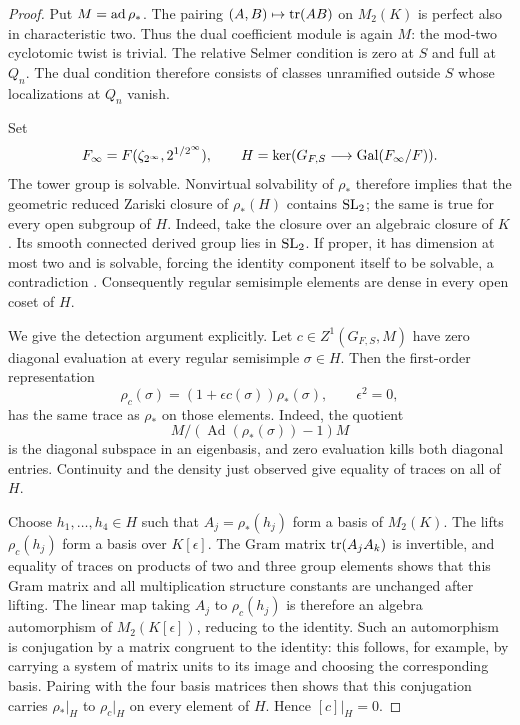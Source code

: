 \begin{proof}
Put $M=\operatorname{ad}\rho_*$.  The pairing $(A,B)\mapsto\operatorname{tr}(AB)$ on $M_2(K)$
is perfect also in characteristic two.  Thus the dual coefficient
module is again $M$: the mod-two cyclotomic twist is trivial.  The
relative Selmer condition is zero at $S$ and full at $Q_n$.  The dual
condition therefore consists of classes unramified outside $S$ whose
localizations at $Q_n$ vanish.

Set
\[
 F_\infty=F(\zeta_{2^\infty},2^{1/2^\infty}),\qquad
 H=\ker(G_{F,S}\longrightarrow\operatorname{Gal}(F_\infty/F)).
\]
The tower group is solvable.  Nonvirtual solvability of $\rho_*$
therefore implies that the geometric reduced Zariski closure of
$\rho_*(H)$ contains $\operatorname{SL}_2$; the same is true for every open subgroup
of $H$. Indeed, take the closure over an algebraic closure of \(K\).
Its smooth connected derived group lies in \(\operatorname{SL}_2\). If proper,
it has dimension at most two and is solvable, forcing the identity
component itself to be solvable, a contradiction
\cite[Corollaries~6.19 and~17.27]{MilneAlgebraicGroups}.
Consequently regular semisimple elements are dense in every open
coset of $H$.

We give the detection argument explicitly.
Let $c\in Z^1(G_{F,S},M)$ have zero diagonal evaluation at every
regular semisimple $\sigma\in H$.  Then the first-order
representation
\[
 \rho_c(\sigma)=(1+\epsilon c(\sigma))\rho_*(\sigma),
 \qquad \epsilon^2=0,
\]
has the same trace as $\rho_*$ on those elements.  Indeed, the quotient
\[
 M/(\operatorname{Ad}(\rho_*(\sigma))-1)M
\]
is the diagonal subspace in an eigenbasis, and zero evaluation kills
both diagonal entries.  Continuity and the
density just observed give equality of traces on all of $H$.

Choose $h_1,\ldots,h_4\in H$ such that $A_j=\rho_*(h_j)$ form a
basis of $M_2(K)$.  The lifts $\rho_c(h_j)$ form a basis over
$K[\epsilon]$.  The Gram matrix $\operatorname{tr}(A_jA_k)$ is invertible, and
equality of traces on products of two and three group elements shows
that this Gram matrix and all multiplication structure constants are
unchanged after lifting.  The linear map taking $A_j$ to
$\rho_c(h_j)$ is therefore an algebra automorphism of $M_2(K[\epsilon])$,
reducing to the identity.  Such an automorphism is conjugation by a
matrix congruent to the identity: this follows, for example, by
carrying a system of matrix units to its image and choosing the
corresponding basis.  Pairing with the four basis matrices then shows
that this conjugation carries $\rho_*|_H$ to $\rho_c|_H$ on every
element of $H$.  Hence $[c]|_H=0$.


\end{proof}
